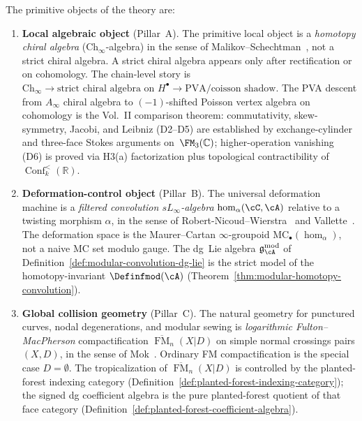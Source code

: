 \begin{remark}
\label{rem:three-pillars}
The primitive objects of the theory are:
\begin{enumerate}[label=\textup{(\Alph*)}]
\item \textbf{Local algebraic object} (Pillar~A). The primitive local
 object is a \emph{homotopy chiral algebra}
 ($\mathrm{Ch}_\infty$-algebra) in the sense of
 Malikov--Schechtman~\cite{MS24}, not a strict chiral algebra. A strict
 chiral algebra appears only after rectification or on cohomology.
 The chain-level story is
 $\mathrm{Ch}_\infty \to \text{strict chiral algebra on } H^\bullet
 \to \text{PVA/coisson shadow}$.
The PVA descent from $A_\infty$ chiral algebra to $(-1)$-shifted
Poisson vertex algebra on cohomology is the Vol.~II comparison theorem:
commutativity, skew-symmetry, Jacobi, and Leibniz (D2--D5) are
established by exchange-cylinder and three-face Stokes arguments
on~$\FM_3(\mathbb{C})$; higher-operation vanishing (D6) is proved
 via H3(a) factorization plus topological contractibility of
 $\operatorname{Conf}_k^{<}(\mathbb{R})$.
\item \textbf{Deformation-control object} (Pillar~B). The universal
 deformation machine is a \emph{filtered convolution $sL_\infty$-algebra}
 $\operatorname{hom}_\alpha(\cC, \cA)$ relative to a twisting morphism
 $\alpha$, in the sense of Robert-Nicoud--Wierstra~\cite{RNW19} and
 Vallette~\cite{Val16}. The deformation space is the Maurer--Cartan
 $\infty$-groupoid $\mathrm{MC}_\bullet(\operatorname{hom}_\alpha)$,
 not a naive MC set modulo gauge.
 The dg~Lie algebra $\mathfrak{g}_\cA^{\mathrm{mod}}$ of
 Definition~\ref{def:modular-convolution-dg-lie} is the strict model of
 the homotopy-invariant $\Definfmod(\cA)$
 (Theorem~\ref{thm:modular-homotopy-convolution}).
\item \textbf{Global collision geometry} (Pillar~C). The natural
 geometry for punctured curves, nodal degenerations, and modular sewing
 is \emph{logarithmic Fulton--MacPherson} compactification
 $\overline{\operatorname{FM}}_n(X|D)$ on simple normal crossings pairs
 $(X, D)$, in the sense of Mok~\cite{Mok25}. Ordinary FM
 compactification is the special case $D = \emptyset$. The
 tropicalization of $\overline{\operatorname{FM}}_n(X|D)$ is controlled
 by the planted-forest indexing category
 (Definition~\ref{def:planted-forest-indexing-category}); the signed
 dg coefficient algebra is the pure planted-forest quotient of that
 face category
 (Definition~\ref{def:planted-forest-coefficient-algebra}).
\end{enumerate}
\end{remark}

